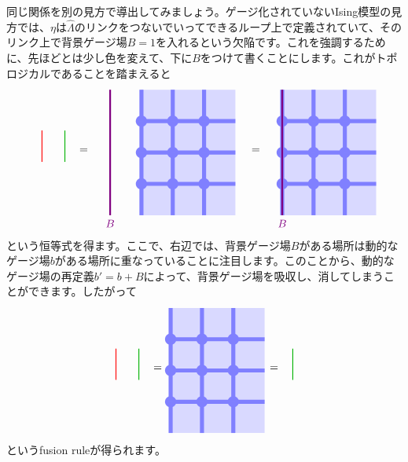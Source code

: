 \documentclass[report,paper=a4, fontsize=12pt, line_length=16cm, number_of_lines=33,dvipdfmx]{jlreq}
\numberwithin{equation}{chapter}
\newcommand{\Lambdah}{\widehat{\Lambda}}
\newcommand{\etaline}{
  \quad \tikz[baseline=0.3cm]{
    \draw[thick,red](0,1)--(0,0);
   }\quad   
}
\newcommand{\KWline}{
  \quad \tikz[baseline=0.3cm]{
    \draw[thick,darkgreen](0,1)--(0,0);
   }\quad 
}
\begin{document}
同じ関係を別の見方で導出してみましょう。ゲージ化されていないIsing模型の見方では、$\eta$は$\Lambdah$のリンクをつないでいってできるループ上で定義されていて、そのリンク上で背景ゲージ場$B=1$を入れるという欠陥です。これを強調するために、先ほどとは少し色を変えて、下に$B$をつけて書くことにします。これがトポロジカルであることを踏まえると
\begin{align}
  \etaline\KWline =\quad
  \begin{tikzpicture}[baseline=0cm]
    \foreach \x in {0,1,2}{
        \foreach \y in {-2,-1,...,1}{
        \fill[plaqblue](\x,\y) rectangle (\x+1,\y+1);
        }
    }
    \foreach \x in {0,1,2}{
        \foreach \y in {-1,0,1}{
            \fill[linkblue] (\x,\y) circle (1.8mm);
        }
    }
    \foreach \x in {0,1,2}{
        \foreach \y in {-1,0,1}{
            \draw[linkblue, line width = 1.3mm](\x,\y)--(\x + 1,\y);
        }
    }
    \foreach \x in {0,1,2}{
        \foreach \y in {-2,-1,...,1}{
            \draw[linkblue, line width = 1.3mm](\x,\y)--(\x,\y + 1);
        }
    }
    \draw[red!50!blue, ultra thick](-1,2)--(-1,-2) node[below]{$B$};
\end{tikzpicture}
\quad=\quad
\begin{tikzpicture}[baseline=0cm]
    \foreach \x in {0,1,2}{
        \foreach \y in {-2,-1,...,1}{
        \fill[plaqblue](\x,\y) rectangle (\x+1,\y+1);
        }
    }
    \foreach \x in {0,1,2}{
        \foreach \y in {-1,0,1}{
            \fill[linkblue] (\x,\y) circle (1.8mm);
        }
    }
    \foreach \x in {0,1,2}{
        \foreach \y in {-1,0,1}{
            \draw[linkblue, line width = 1.3mm](\x,\y)--(\x + 1,\y);
        }
    }
    \foreach \x in {0,1,2}{
        \foreach \y in {-2,-1,...,1}{
            \draw[linkblue, line width = 1.3mm](\x,\y)--(\x,\y + 1);
        }
    }
    \draw[red!50!blue, ultra thick](0,2)--(0,-2) node[below]{$B$};
\end{tikzpicture}
\end{align}
という恒等式を得ます。ここで、右辺では、背景ゲージ場$B$がある場所は動的なゲージ場$b$がある場所に重なっていることに注目します。このことから、動的なゲージ場の再定義$b'=b+B$によって、背景ゲージ場を吸収し、消してしまうことができます。したがって
\begin{align}
  \etaline \KWline =
  \begin{tikzpicture}[baseline=0cm]
    \foreach \x in {0,1,2}{
        \foreach \y in {-2,-1,...,1}{
        \fill[plaqblue](\x,\y) rectangle (\x+1,\y+1);
        }
    }
    \foreach \x in {0,1,2}{
        \foreach \y in {-1,0,1}{
            \fill[linkblue] (\x,\y) circle (1.8mm);
        }
    }
    \foreach \x in {0,1,2}{
        \foreach \y in {-1,0,1}{
            \draw[linkblue, line width = 1.3mm](\x,\y)--(\x + 1,\y);
        }
    }
    \foreach \x in {0,1,2}{
        \foreach \y in {-2,-1,...,1}{
            \draw[linkblue, line width = 1.3mm](\x,\y)--(\x,\y + 1);
        }
    }
\end{tikzpicture}
=\KWline
\end{align}
というfusion ruleが得られます。
\end{document}
